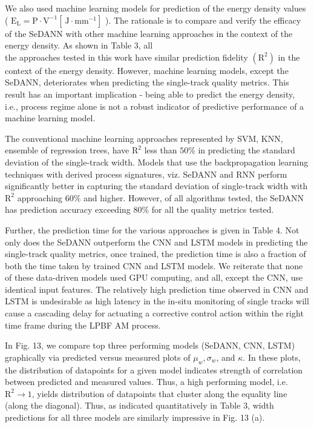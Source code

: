 \documentclass[10pt]{article}
\begin{document}
We also used machine learning models for prediction of the energy density values ( $\mathrm{E}_{\mathrm{L}}=\mathrm{P} \cdot \mathrm{V}^{-1}\left[\mathrm{~J} \cdot \mathrm{mm}^{-1}\right]$ ). The rationale is to compare and verify the efficacy of the SeDANN with other machine learning approaches in the context of the energy density. As shown in Table 3, all\\
the approaches tested in this work have similar prediction fidelity $\left(\mathrm{R}^{2}\right)$ in the context of the energy density. However, machine learning models, except the SeDANN, deteriorates when predicting the single-track quality metrics. This result has an important implication - being able to predict the energy density, i.e., process regime alone is not a robust indicator of predictive performance of a machine learning model.

The conventional machine learning approaches represented by SVM, KNN, ensemble of regression trees, have $\mathrm{R}^{2}$ less than $50 \%$ in predicting the standard deviation of the single-track width. Models that use the backpropagation learning techniques with derived process signatures, viz. SeDANN and RNN perform significantly better in capturing the standard deviation of single-track width with $\mathrm{R}^{2}$ approaching $60 \%$ and higher. However, of all algorithms tested, the SeDANN has prediction accuracy exceeding $80 \%$ for all the quality metrics tested.

Further, the prediction time for the various approaches is given in Table 4. Not only does the SeDANN outperform the CNN and LSTM models in predicting the single-track quality metrics, once trained, the prediction time is also a fraction of both the time taken by trained CNN and LSTM models. We reiterate that none of these data-driven models used GPU computing, and all, except the CNN, use identical input features. The relatively high prediction time observed in CNN and LSTM is undesirable as high latency in the in-situ monitoring of single tracks will cause a cascading delay for actuating a corrective control action within the right time frame during the LPBF AM process.

In Fig. 13, we compare top three performing models (SeDANN, CNN, LSTM) graphically via predicted versus measured plots of $\mu_{w}, \sigma_{w}$, and $\kappa$. In these plots, the distribution of datapoints for a given model indicates strength of correlation between predicted and measured values. Thus, a high performing model, i.e. $\mathrm{R}^{2} \rightarrow 1$, yields distribution of datapoints that cluster along the equality line (along the diagonal). Thus, as indicated quantitatively in Table 3, width predictions for all three models are similarly impressive in Fig. 13 (a).
\end{document}
